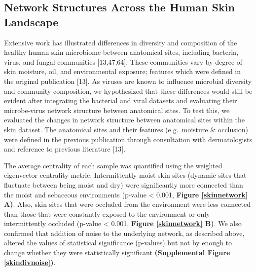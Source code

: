 \documentclass[12pt,]{article}
\begin{document}
\subsection{Network Structures Across the Human Skin
Landscape}\label{network-structures-across-the-human-skin-landscape}

Extensive work has illustrated differences in diversity and composition
of the healthy human skin microbiome between anatomical sites, including
bacteria, virus, and fungal communities {[}13,47,64{]}. These
communities vary by degree of skin moisture, oil, and environmental
exposure; features which were defined in the original publication
{[}13{]}. As viruses are known to influence microbial diversity and
community composition, we hypothesized that these differences would
still be evident after integrating the bacterial and viral datasets and
evaluating their microbe-virus network structure between anatomical
sites. To test this, we evaluated the changes in network structure
between anatomical sites within the skin dataset. The anatomical sites
and their features (e.g.~moisture \& occlusion) were defined in the
previous publication through consultation with dermatologists and
reference to previous literature {[}13{]}.

The average centrality of each sample was quantified using the weighted
eigenvector centrality metric. Intermittently moist skin sites (dynamic
sites that fluctuate between being moist and dry) were significantly
more connected than the moist and sebaceous environments (p-value
\textless{} 0.001, \textbf{Figure \ref{skinnetwork} A)}. Also, skin
sites that were occluded from the environment were less connected than
those that were constantly exposed to the environment or only
intermittently occluded (p-value \textless{} 0.001, \textbf{Figure
\ref{skinnetwork} B)}. We also confirmed that addition of noise to the
underlying network, as described above, altered the values of
statistical significance (p-values) but not by enough to change whether
they were statistically significant \textbf{(Supplemental Figure
\ref{skindivnoise})}.
\end{document}
